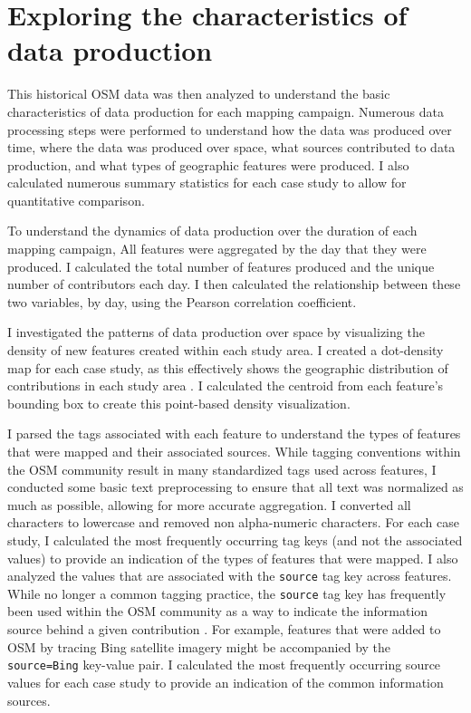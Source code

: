 \section{Exploring the characteristics of data production}
\label{sec-production}

This historical OSM data was then analyzed to understand the basic characteristics of data production for each mapping campaign. Numerous data processing steps were performed to understand how the data was produced over time, where the data was produced over space, what sources contributed to data production, and what types of geographic features were produced. I also calculated numerous summary statistics for each case study to allow for quantitative comparison.

To understand the dynamics of data production over the duration of each mapping campaign, All features were aggregated by the day that they were produced. I calculated the total number of features produced and the unique number of contributors each day. I then calculated the relationship between these two variables, by day, using the Pearson correlation coefficient. 

I investigated the patterns of data production over space by visualizing the density of new features created within each study area. I created a dot-density map for each case study, as this effectively shows the geographic distribution of contributions in each study area \parencite{kimerling_dotting_2009}. I calculated the centroid from each feature's bounding box to create this point-based density visualization. 

I parsed the tags associated with each feature to understand the types of features that were mapped and their associated sources. While tagging conventions within the OSM community result in many standardized tags used across features, I conducted some basic text preprocessing to ensure that all text was normalized as much as possible, allowing for more accurate aggregation. I converted all characters to lowercase and removed non alpha-numeric characters. For each case study, I calculated the most frequently occurring tag keys (and not the associated values) to provide an indication of the types of features that were mapped. I also analyzed the values that are associated with the \texttt{source} tag key across features. While no longer a common tagging practice, the \texttt{source} tag key has frequently been used within the OSM community as a way to indicate the information source behind a given contribution \parencite{openstreetmap_wiki_keysource_2020}. For example, features that were added to OSM by tracing Bing satellite imagery might be accompanied by the \texttt{source=Bing} key-value pair. I calculated the most frequently occurring source values for each case study to provide an indication of the common information sources.  

